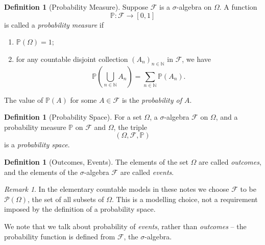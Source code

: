 \documentclass[11pt]{article}
\numberwithin{equation}{section}
\theoremstyle{definition}
\newtheorem{definition}[theorem]{Definition}
\theoremstyle{remark}
\newtheorem{remark}[theorem]{Remark}
\newcommand{\pqty}[1]{\left(#1\right)}
\newcommand{\ccintv}[2]{[#1,#2]}
\newcommand{\functiondomain}[3]{#1:#2\to #3}
\newcommand{\NN}{\mathbb N}
\newcommand{\powerset}{\mathcal P}
\newcommand{\eventSpace}{\mathcal F}
\newcommand{\Prob}{\mathbb P}
\begin{document}
\begin{definition}[Probability Measure]\label{probability-definition-002}
    \label{probability-def:probability-measure}%
    Suppose \(\eventSpace\) is a \(\sigma\)-algebra on \(\Omega\). A function
    \[
        \functiondomain{\Prob}{\eventSpace}{\ccintv{0}{1}}
    \]
    is called a \emph{probability measure} if
    \begin{enumerate}
        \item \(\Prob\pqty{\Omega} = 1\);
        \item for any countable disjoint collection \(\pqty{A_n}_{n \in \NN}\) in \(\eventSpace\), we have
        \[
            \Prob\pqty{\bigcup_{n \in \NN} A_n} = \sum_{n \in \NN} \Prob\pqty{A_n}.
        \]
    \end{enumerate}

    The value of \(\Prob\pqty{A}\) for some \(A \in \eventSpace\) is the \emph{probability of \(A\)}.
\end{definition}

\begin{definition}[Probability Space]\label{probability-definition-003}
    \label{probability-def:probability-space}%
    For a set \(\Omega\), a \(\sigma\)-algebra \(\eventSpace\) on \(\Omega\), and a probability measure \(\Prob\) on \(\eventSpace\) and \(\Omega\), the triple
    \[
        \pqty{\Omega, \eventSpace, \Prob}
    \]
    is a \emph{probability space}.
\end{definition}

\begin{definition}[Outcomes, Events]\label{probability-definition-004}
    \label{probability-def:outcome-event}%
    The elements of the set \(\Omega\) are called \emph{outcomes}, and the elements of the \(\sigma\)-algebra \(\eventSpace\) are called \emph{events}.
\end{definition}

\begin{remark}\label{probability-remark-001}
    In the elementary countable models in these notes we choose \(\eventSpace\) to be \(\powerset\pqty{\Omega}\), the set of all subsets of \(\Omega\). This is a modelling choice, not a requirement imposed by the definition of a probability space.
\end{remark}

We note that we talk about probability of \emph{events}, rather than \emph{outcomes} -- the probability function is defined from \(\eventSpace\), the \(\sigma\)-algebra.
\end{document}
